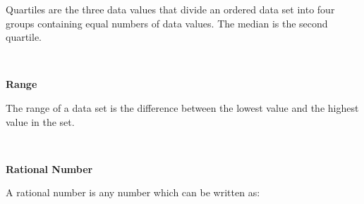 \begin{description}
\begin{description}
          \label{m39400*id212998}Quartiles are the three data values that divide an ordered data set into four groups containing equal numbers of data values. The median is the second quartile. \par 
          \\\end{description}
	    \vspace{.3cm}
	    \item[{\large \bfseries R}]\noindent\raggedright
	    {\bf  Range }\\\begin{description}\item{\hspace{.3cm}}\hspace{.3cm}
          \label{m39400*id212688}The range of a data set is the difference between the lowest value and the highest value in the set. \par 
          \\\end{description}
	    \item[] \noindent\raggedright {\bf  Rational Number }\\\begin{description}\item{\hspace{.3cm}}\hspace{.3cm}
      \label{m38348*id62709}A rational number is any number which can be written as:\par 
      \label{m38348*uid6}\nopagebreak\noindent{}
\end{description}
\end{description}

